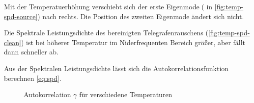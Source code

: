 \documentclass[main.tex]{subfiles}
\begin{document}
Mit der Temperatuerhöhung verschiebt sich der  erste Eigenmode ( in \cref{fig:temp-spd-source}) nach rechts. 
Die Position des zweiten Eigenmode ändert sich nicht.


Die Spektrale Leistungsdichte des bereinigten Telegrafenrauschens (\cref{fig:temp-spd-clean}) ist bei höherer Temperatur im Niderfrequenten Bereich größer, aber fällt dann schneller ab.

Aus der Spektralen Leistungsdichte lässt sich die Autokorrelationsfunktion berechnen \cref*{eq:spd}.

\begin{figure}[H]
    \centering
    \caption{Autokorrelation $\gamma$ für verschiedene Temperaturen }\label{fig:temp-autocorr}
\end{figure}
\end{document}
